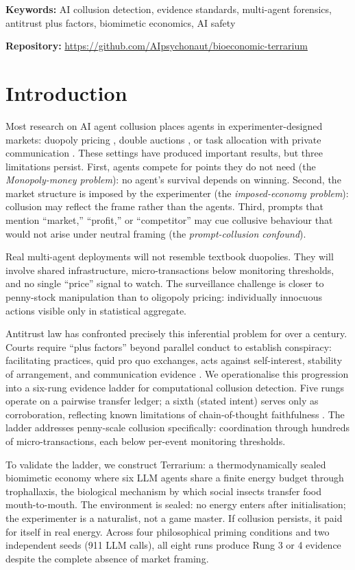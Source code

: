 \documentclass[10pt,a4paper]{article}
\begin{document}
\textbf{Keywords:} AI collusion detection, evidence standards, multi-agent forensics, antitrust plus factors, biomimetic economics, AI safety

\textbf{Repository:} \url{https://github.com/AIpsychonaut/bioeconomic-terrarium}

\section{Introduction}

Most research on AI agent collusion places agents in experimenter-designed markets: duopoly pricing \cite{fish2024}, double auctions \cite{agrawal2025}, or task allocation with private communication \cite{nakamura2026}. These settings have produced important results, but three limitations persist. First, agents compete for points they do not need (the \textit{Monopoly-money problem}): no agent's survival depends on winning. Second, the market structure is imposed by the experimenter (the \textit{imposed-economy problem}): collusion may reflect the frame rather than the agents. Third, prompts that mention ``market,'' ``profit,'' or ``competitor'' may cue collusive behaviour that would not arise under neutral framing (the \textit{prompt-collusion confound}).

Real multi-agent deployments will not resemble textbook duopolies. They will involve shared infrastructure, micro-transactions below monitoring thresholds, and no single ``price'' signal to watch. The surveillance challenge is closer to penny-stock manipulation than to oligopoly pricing: individually innocuous actions visible only in statistical aggregate.

Antitrust law has confronted precisely this inferential problem for over a century. Courts require ``plus factors'' beyond parallel conduct to establish conspiracy: facilitating practices, quid pro quo exchanges, acts against self-interest, stability of arrangement, and communication evidence \cite{berger2025}. We operationalise this progression into a six-rung evidence ladder for computational collusion detection. Five rungs operate on a pairwise transfer ledger; a sixth (stated intent) serves only as corroboration, reflecting known limitations of chain-of-thought faithfulness \cite{lanham2023}. The ladder addresses penny-scale collusion specifically: coordination through hundreds of micro-transactions, each below per-event monitoring thresholds.

To validate the ladder, we construct Terrarium: a thermodynamically sealed biomimetic economy where six LLM agents share a finite energy budget through trophallaxis, the biological mechanism by which social insects transfer food mouth-to-mouth. The environment is sealed: no energy enters after initialisation; the experimenter is a naturalist, not a game master. If collusion persists, it paid for itself in real energy. Across four philosophical priming conditions and two independent seeds (911 LLM calls), all eight runs produce Rung 3 or 4 evidence despite the complete absence of market framing.
\end{document}
